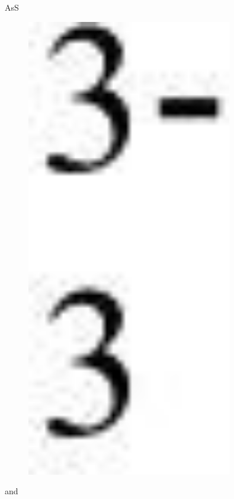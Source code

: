 AsS\begin{figure}[H]
	\centering
	\includegraphics[width=0.8\textwidth]{assets/327}
	\caption*{}
\end{figure} and
